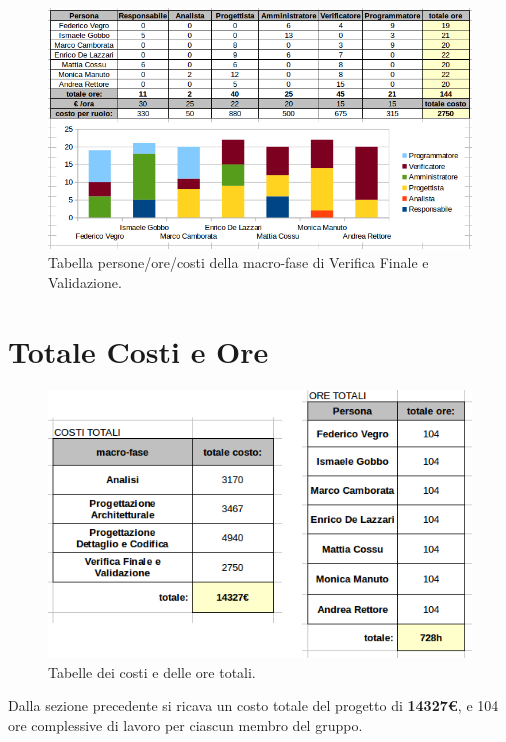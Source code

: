 \begin{figure}[h]
\begin{center}
\includegraphics[width=\textwidth, height=\textheight, keepaspectratio]{img/verival-personeorecosti.png}
\caption{Tabella persone/ore/costi della macro-fase di Verifica Finale e Validazione.}
\end{center}
\end{figure}

\newpage

\section{Totale Costi e Ore}

\begin{figure}[h]
\begin{center}
\includegraphics[scale=0.50]{img/totali.png}
\caption{Tabelle dei costi e delle ore totali.}
\end{center}
\end{figure}

Dalla sezione precedente si ricava un costo totale del progetto di \textbf{14327€}, e 104 ore complessive di lavoro per ciascun membro del gruppo.


